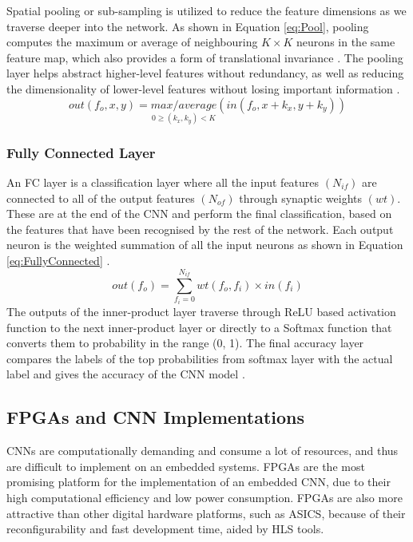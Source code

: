 \documentclass[12pt]{article}
\begin{document}
Spatial pooling or sub-sampling is utilized to reduce the feature dimensions as we traverse deeper into the network. As shown in Equation \ref{eq:Pool}, pooling computes the maximum or average of neighbouring $K\times K$ neurons in the same feature map, which also provides a form of translational invariance \cite{PoolAnalysis}. The pooling layer helps abstract higher-level features without redundancy, as well as reducing the dimensionality of lower-level features without losing important information \cite{SudaFpgaAccelerator}.
\begin{equation}
out(f_o,x,y)=\underset{0\geqslant (k_x,k_y)<K}{max/average}(in(f_o,x+k_x,y+k_y))
\label{eq:Pool}
\end{equation}

\subsubsection{Fully Connected Layer}
\label{sec:Background-CNN-FC}
\vspace{-12pt}

An FC layer is a classification layer where all the input features $(N_{if})$ are connected to all of the output features $(N_{of})$ through synaptic weights $(wt)$. These are at the end of the CNN and perform the final classification, based on the features that have been recognised by the rest of the network. Each output neuron is the weighted summation of all the input neurons as shown in Equation \ref{eq:FullyConnected} \cite{SudaFpgaAccelerator}.
\begin{equation}
out(f_o)=\sum^{N_{if}}_{f_i=0}wt(f_o,f_i)\times in(f_i)
\label{eq:FullyConnected}
\end{equation}
The outputs of the inner-product layer traverse through ReLU based activation function to the next inner-product layer or directly to a Softmax function that converts them to probability in the range (0, 1). The final accuracy layer compares the labels of the top probabilities from softmax layer with the actual label and gives the accuracy of the CNN model \cite{SudaFpgaAccelerator}.

\subsection{FPGAs and CNN Implementations}
\label{sec:Background-FpgaCnnImpl}
\vspace{-12pt}

CNNs are computationally demanding and consume a lot of resources, and thus are difficult to implement on an embedded systems. FPGAs are the most promising platform for the implementation of an embedded CNN, due to their high computational efficiency and low power consumption. FPGAs are also more attractive than other digital hardware platforms, such as ASICS, because of their reconfigurability and fast development time, aided by HLS tools.
\end{document}
